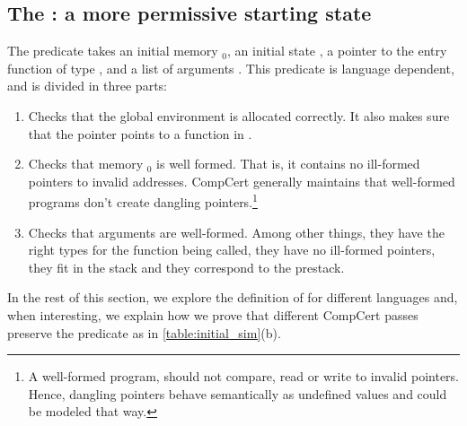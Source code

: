\subsection{The : a more permissive starting state}\label{sec:entry_point}
The predicate  takes an initial memory $_0$, an initial state , a pointer to the entry function  of type , and a list of arguments . This predicate is language dependent, and is divided in three parts:
\begin{enumerate}
\item Checks that the global environment  is allocated correctly. It also makes sure that the pointer  points to a function in .
\item Checks that memory  $_0$ is well formed. That is, it contains no ill-formed pointers to invalid addresses. CompCert generally maintains that well-formed programs don't create dangling pointers.\footnote{A well-formed program, should not compare, read or write to invalid pointers. Hence, dangling pointers behave semantically as undefined values and could be modeled that way.}
\item Checks that arguments are well-formed. Among other things, they have the right types for the function being called, they have no ill-formed pointers, they fit in the stack and they correspond to the prestack.  
\end{enumerate}
In the rest of this section, we explore the definition of  for different languages and, when interesting, we explain how we prove that different CompCert passes preserve the predicate as in \autoref{table:initial_sim}(b).

